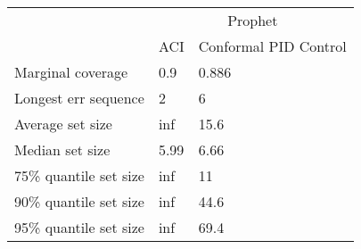 \begin{tabular}{lll}
\toprule
& \multicolumn{2}{c}{Prophet} \\
& ACI & Conformal PID Control \\
\midrule
Marginal coverage & 0.9 & 0.886 \\
Longest err sequence & 2 & 6 \\
Average set size & inf & 15.6 \\
Median set size & 5.99 & 6.66 \\
75\% quantile set size & inf & 11 \\
90\% quantile set size & inf & 44.6 \\
95\% quantile set size & inf & 69.4 \\
\bottomrule
\end{tabular}
